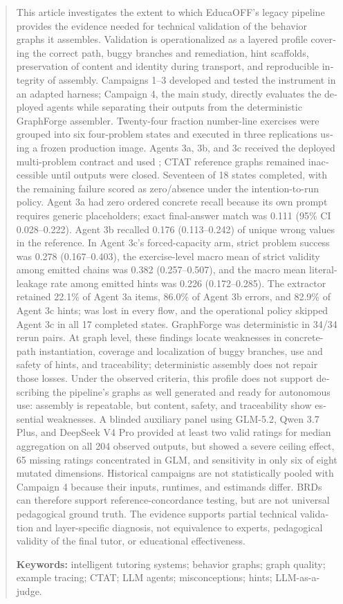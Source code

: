\documentclass[11pt,a4paper]{article}
\begin{document}
\begin{otherlanguage}{english}
\begin{abstract}
This article investigates the extent to which EducaOFF's legacy pipeline provides the evidence needed for technical validation of the behavior graphs it assembles. Validation is operationalized as a layered profile covering the correct path, buggy branches and remediation, hint scaffolds, preservation of content and identity during transport, and reproducible integrity of assembly. Campaigns 1--3 developed and tested the instrument in an adapted harness; Campaign 4, the main study, directly evaluates the deployed agents while separating their outputs from the deterministic GraphForge assembler. Twenty-four fraction number-line exercises were grouped into six four-problem states and executed in three replications using a frozen production image. Agents 3a, 3b, and 3c received the deployed multi-problem contract and used ; CTAT reference graphs remained inaccessible until outputs were closed. Seventeen of 18 states completed, with the remaining failure scored as zero/absence under the intention-to-run policy. Agent 3a had zero ordered concrete recall because its own prompt requires generic placeholders; exact final-answer match was 0.111 (95\% CI 0.028--0.222). Agent 3b recalled 0.176 (0.113--0.242) of unique wrong values in the reference. In Agent 3c's forced-capacity arm, strict problem success was 0.278 (0.167--0.403), the exercise-level macro mean of strict validity among emitted chains was 0.382 (0.257--0.507), and the macro mean literal-leakage rate among emitted hints was 0.226 (0.172--0.285). The extractor retained 22.1\% of Agent 3a items, 86.0\% of Agent 3b errors, and 82.9\% of Agent 3c hints;  was lost in every flow, and the operational policy skipped Agent 3c in all 17 completed states. GraphForge was deterministic in 34/34 rerun pairs. At graph level, these findings locate weaknesses in concrete-path instantiation, coverage and localization of buggy branches, use and safety of hints, and traceability; deterministic assembly does not repair those losses. Under the observed criteria, this profile does not support describing the pipeline's graphs as well generated and ready for autonomous use: assembly is repeatable, but content, safety, and traceability show essential weaknesses. A blinded auxiliary panel using GLM-5.2, Qwen 3.7 Plus, and DeepSeek V4 Pro provided at least two valid ratings for median aggregation on all 204 observed outputs, but showed a severe ceiling effect, 65 missing ratings concentrated in GLM, and sensitivity in only six of eight mutated dimensions. Historical campaigns are not statistically pooled with Campaign 4 because their inputs, runtimes, and estimands differ. BRDs can therefore support reference-concordance testing, but are not universal pedagogical ground truth. The evidence supports partial technical validation and layer-specific diagnosis, not equivalence to experts, pedagogical validity of the final tutor, or educational effectiveness.

\smallskip\noindent\textbf{Keywords:} intelligent tutoring systems; behavior graphs; graph quality; example tracing; CTAT; LLM agents; misconceptions; hints; LLM-as-a-judge.
\end{abstract}
\end{otherlanguage}
\end{document}
